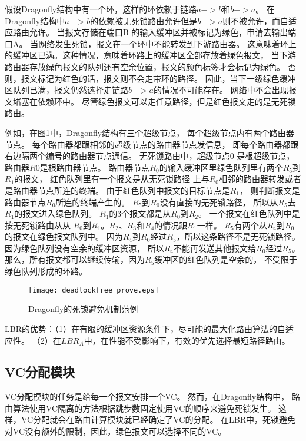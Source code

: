 假设Dragonfly结构中有一个环，这样的环依赖于链路$a->b$和$b->a$。
在Dragonfly结构中$a->b$的依赖被无死锁路由允许但是$b->a$则不被允许，而自适应路由允许。
当报文存储在端口B 的输入缓冲区并被标记为绿色，申请去输出端口A。
当网络发生死锁，报文在一个环中不能转发到下游路由器。
这意味着环上的缓冲区已满。这种情况，意味着环路上的缓冲区全部存放着绿色报文，
当下游路由器存放绿色报文的队列还有空余位置，报文的颜色标签才会标记为绿色。
否则，报文标记为红色的话，报文则不会走带环的路径。
因此，当下一级绿色缓冲区队列已满，报文仍然选择走链路$b->a$的情况不可能存在。
网络中不会出现报文堵塞在依赖环中。
尽管绿色报文可以走任意路径，但是红色报文走的是无死锁路由。

例如，在图\ref{fig:deadlockfree}中，Dragonfly结构有三个超级节点，
每个超级节点内有两个路由器节点。
每个路由器都跟相邻的超级节点的路由器节点发信息，
即每个路由器都跟右边隔两个编号的路由器节点通信。
无死锁路由中，超级节点$0$ 是根超级节点，路由器$R0$是根路由器节点。
路由器节点$R_0$的输入缓冲区里绿色队列里有两个$R_5$到$R_1$的报文，
红色队列里有一个报文是从无死锁路径
上与$R_0$相邻的路由器转发或者是路由器节点所连的终端。
由于红色队列中报文的目标节点是$R_1$，
则判断报文是路由器节点$R_0$所连的终端产生的。
$R_5$到$R_0$没有直接的无死锁路径，
所以从$R_5$去$R_1$的报文进入绿色队列。
$R_1$的3个报文都是从$R_0$到$R_2$。
一个报文在红色队列中是按无死锁路由从从
$R_0$到$R_1$。$R_2$、$R_3$和$R_4$的情况跟$R_1$一样。
$R_5$有两个从$R_4$到$R_0$的报文在绿色报文队列中。
因为$R_4$到$R_0$经过$R_5$，所以这条路径不是无死锁路径。
因为绿色队列没有空余的缓冲区资源，
所以$R_4$不能再发送其他报文给$R_0$经过$R_5$。
那么，所有报文都可以继续传输，因为$R_5$缓冲区的红色队列是空余的，
不受限于绿色队列形成的环路。

\begin{figure}[t]
  \centering
  \texttt{[image: deadlockfree\_prove.eps]}
  \caption{Dragonfly的死锁避免机制范例}
  \label{fig:deadlockfree}
\end{figure}

LBR的优势：（1）在有限的缓冲区资源条件下，尽可能的最大化路由算法的自适应性。
（2）在$LBR_A$中，在性能不受影响下，有效的优先选择最短路径路由。

\subsection{VC分配模块}

VC分配模块的任务是给每一个报文安排一个VC。
然而，在Dragonfly结构中，
路由算法使用VC隔离的方法根据跳步数固定使用VC的顺序来避免死锁发生。
这样，VC分配就会在路由计算模块就已经确定了VC的分配。
在LBR中，死锁避免对VC没有额外的限制，因此，绿色报文可以选择不同的VC。

